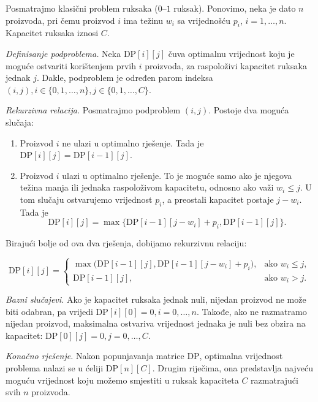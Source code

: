 \begin{solution}
	
	Posmatrajmo klasični problem ruksaka ($0$--$1$ ruksak). Ponovimo, neka je dato $n$ proizvoda, pri čemu proizvod $i$ ima težinu $w_i$ sa vrijednošću $p_i$,  $i=1,\ldots,n$. Kapacitet ruksaka iznosi $C$.
	
	\medskip
	
	\textit{Definisanje podproblema.} Neka $\textrm{DP}[i][j]$ čuva optimalnu vrijednost koju je moguće ostvariti korištenjem prvih $i$ proizvoda, za raspoloživi kapacitet ruksaka jednak $j$.  Dakle, podproblem je određen parom indeksa $
	(i,j), 
	i \in \{0,1,\ldots,n\}, 
	j \in \{0,1,\ldots,C\}.$
	
	\medskip
	
	\textit{Rekurzivna relacija.} Posmatrajmo podproblem $(i,j)$.	Postoje dva moguća slučaja:
	
	\begin{enumerate}
		\item Proizvod $i$ ne ulazi u optimalno rješenje. Tada je
	    $  \textrm{DP}[i][j] = \textrm{DP}[i-1][j].$
		\item Proizvod $i$ ulazi u optimalno rješenje. To je moguće samo ako je njegova težina manja ili jednaka raspoloživom kapacitetu, odnosno ako važi $w_i \leq j$. U tom slučaju ostvarujemo vrijednost $p_i$, a preostali kapacitet postaje $j-w_i$. Tada je
		$$
		\textrm{DP}[i][j] =\max\{ \textrm{DP}[i-1][j-w_i] + p_i, \textrm{DP}[i-1][j] \}.
		$$
		
	\end{enumerate}
	
	Birajući bolje od ova dva rješenja, dobijamo rekurzivnu relaciju:
	
	$$
	\textrm{DP}[i][j] =
	\begin{cases}
		\max\bigl(\textrm{DP}[i-1][j],\textrm{DP}[i-1][j-w_i] + p_i\bigr),
		& \text{ako } w_i \leq j, \\
		\textrm{DP}[i-1][j],
		& \text{ako } w_i > j.
	\end{cases}
	$$
	\medskip
	
	\textit{Bazni slučajevi.} Ako je kapacitet ruksaka jednak nuli, nijedan proizvod ne može biti odabran, pa vrijedi $
	\textrm{DP}[i][0]=0, i=0,\ldots,n.$  Takođe, ako ne razmatramo nijedan proizvod, maksimalna ostvariva vrijednost jednaka je nuli bez obzira na kapacitet: $\textrm{DP}[0][j]=0, j=0,\ldots,C.$
	
	\medskip
	
	\textit{Konačno rješenje.}	Nakon popunjavanja matrice $\textrm{DP}$, optimalna vrijednost problema nalazi se u ćeliji $
	\textrm{DP}[n][C].$	Drugim riječima, ona predstavlja najveću moguću vrijednost koju možemo smjestiti u ruksak kapaciteta $C$ razmatrajući svih $n$ proizvoda.
	

\end{solution}
